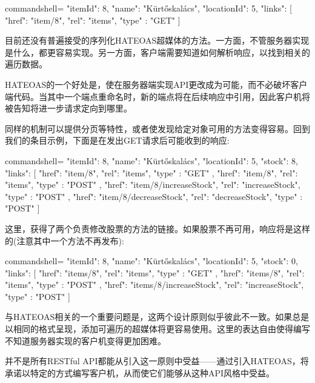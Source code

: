 \begin{tcblisting}{commandshell={}}
{
  "itemId": 8,
  "name": "Kürtőskalács",
  "locationId": 5,
  "links": [
    {
      "href": "item/8",
      "rel": "items",
      "type" : "GET"
    }
  ]
}
\end{tcblisting}

目前还没有普遍接受的序列化HATEOAS超媒体的方法。一方面，不管服务器实现是什么，都更容易实现。另一方面，客户端需要知道如何解析响应，以找到相关的遍历数据。

HATEOAS的一个好处是，使在服务器端实现API更改成为可能，而不必破坏客户端代码。当其中一个端点重命名时，新的端点将在后续响应中引用，因此客户机将被告知将进一步请求定向到哪里。

同样的机制可以提供分页等特性，或者使发现给定对象可用的方法变得容易。回到我们的条目示例，下面是在发出GET请求后可能收到的响应:

\begin{tcblisting}{commandshell={}}
{
  "itemId": 8,
  "name": "Kürtőskalács",
  "locationId": 5,
  "stock": 8,
  "links": [
    {
      "href": "item/8",
      "rel": "items",
      "type" : "GET"
    },
    {
      "href": "item/8",
      "rel": "items",
      "type" : "POST"
    },
    {
      "href": "item/8/increaseStock",
      "rel": "increaseStock",
      "type" : "POST"
    },
    {
      "href": "item/8/decreaseStock",
      "rel": "decreaseStock",
      "type" : "POST"
    }
  ]
}
\end{tcblisting}

这里，获得了两个负责修改股票的方法的链接。如果股票不再可用，响应将是这样的(注意其中一个方法不再发布):

\begin{tcblisting}{commandshell={}}
{
  "itemId": 8,
  "name": "Kürtőskalács",
  "locationId": 5,
  "stock": 0,
  "links": [
    {
      "href": "items/8",
      "rel": "items",
      "type" : "GET"
    },
    {
      "href": "items/8",
      "rel": "items",
      "type" : "POST"
    },
    {
      "href": "items/8/increaseStock",
      "rel": "increaseStock",
      "type" : "POST"
    }
  ]
}
\end{tcblisting}

与HATEOAS相关的一个重要问题是，这两个设计原则似乎彼此不一致。如果总是以相同的格式呈现，添加可遍历的超媒体将更容易使用。这里的表达自由使得编写不知道服务器实现的客户机变得更加困难。

并不是所有RESTful API都能从引入这一原则中受益——通过引入HATEOAS，将承诺以特定的方式编写客户机，从而使它们能够从这种API风格中受益。

